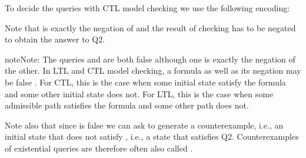 \documentclass[letterpaper,10pt,english]{sphinxmanual}
\begin{document}
To decide the queries with CTL model checking we use the following encoding:

\begin{sphinxVerbatim}[commandchars=\\\{\}]
  
  
  

  
     
      
\end{sphinxVerbatim}

Note that  is exactly the negation of  and the result of checking  has to be negated to obtain the answer to Q2.

\begin{sphinxadmonition}{note}{Note:}
The queries  and  are both false although one is exactly the negation of the other.
In LTL and CTL model checking, a formula as well as its negation may be false .
For CTL, this is the case when some initial state satisfy the formula and some other initial state does not.
For LTL, this is the case when some admissible path satisfies the formula and some other path does not.
\end{sphinxadmonition}

Note also that since  is false we can ask {\hyperref[\detokenize{Installation:installation-nusmv}]{}} to generate a counterexample, i.e.,
an initial state that does not satisfy , i.e., a state that satisfies Q2.
Counterexamples of existential queries are therefore often also called .
\end{document}
